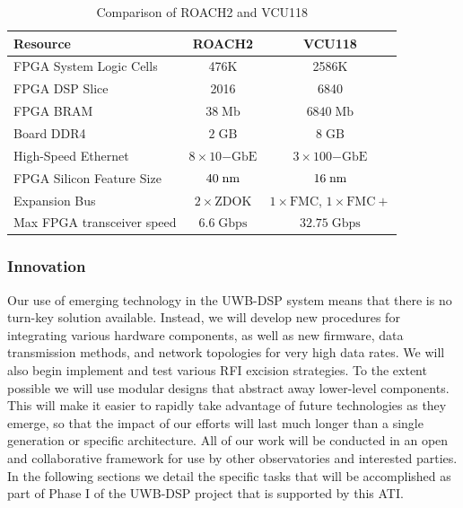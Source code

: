 \documentclass[10pt]{myNSF}
\begin{document}
\begin{table}[h]
  \centering
  \caption{Comparison of ROACH2 and VCU118 \label{table:fpgas}}
  \begin{tabular}{|l|c|c|}
    \hline
    Resource & ROACH2 & VCU118 \\
    \hline
    FPGA System Logic Cells & 476K & 2586K \\
    FPGA DSP Slice & 2016 & 6840 \\
    FPGA BRAM & $38\; \mathrm{Mb}$ & $6840\; \mathrm{Mb}$ \\
    Board DDR4 & $2\; \mathrm{GB}$ & $8\; \mathrm{GB}$ \\
    High-Speed Ethernet & $8 \times 10\mathrm{-GbE}$ & $3 \times 100\mathrm{-GbE}$ \\
    FPGA Silicon Feature Size & $40\; \textrm{nm}$ & $16\; \textrm{nm}$ \\
    Expansion Bus & $2 \times \mathrm{ZDOK}$ & $1 \times \mathrm{FMC}$, $1 \times \mathrm{FMC}+$ \\
    Max FPGA transceiver speed & $6.6\; \mathrm{Gbps}$ & $32.75\; \mathrm{Gbps}$ \\
    \hline
  \end{tabular}
\end{table}

\subsubsection{Innovation}
\label{sec:innovation}

Our use of emerging technology in the UWB-DSP system means that there
is no turn-key solution available.  Instead, we will develop new
procedures for integrating various hardware components, as well as new
firmware, data transmission methods, and network topologies for very
high data rates.  We will also begin implement and test various RFI
excision strategies.  To the extent possible we will use modular
designs that abstract away lower-level components.  This will make it
easier to rapidly take advantage of future technologies as they
emerge, so that the impact of our efforts will last much longer than a
single generation or specific architecture.  All of our work will be
conducted in an open and collaborative framework for use by other
observatories and interested parties.  In the following sections we
detail the specific tasks that will be accomplished as part of Phase
{\sc I} of the UWB-DSP project that is supported by this ATI.

\label{sec:adc_fpga}
\end{document}

